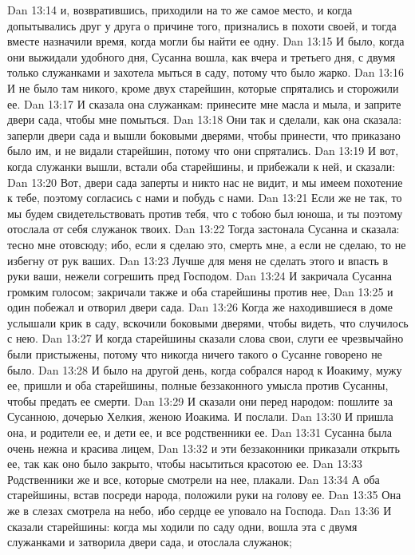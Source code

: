 \vs Dan 13:14 и, возвратившись, приходили на то же самое место, и когда допытывались друг у друга о причине того, признались в похоти своей, и тогда вместе назначили время, когда могли бы найти ее одну.
\vs Dan 13:15 И было, когда они выжидали удобного дня, Сусанна вошла, как вчера и третьего дня, с двумя только служанками и захотела мыться в саду, потому что было жарко.
\vs Dan 13:16 И не было там никого, кроме двух старейшин, которые спрятались и сторожили ее.
\vs Dan 13:17 И сказала она служанкам: принесите мне масла и мыла, и заприте двери сада, чтобы мне помыться.
\vs Dan 13:18 Они так и сделали, как она сказала: заперли двери сада и вышли боковыми дверями, чтобы принести, что приказано было им, и не видали старейшин, потому что они спрятались.
\vs Dan 13:19 И вот, когда служанки вышли, встали оба старейшины, и прибежали к ней, и сказали:
\vs Dan 13:20 Вот, двери сада заперты и никто нас не видит, и мы имеем похотение к тебе, поэтому согласись с нами и побудь с нами.
\vs Dan 13:21 Если же не так, то мы будем свидетельствовать против тебя, что с тобою был юноша, и ты поэтому отослала от себя служанок твоих.
\vs Dan 13:22 Тогда застонала Сусанна и сказала: тесно мне отовсюду; ибо, если я сделаю это, смерть мне, а если не сделаю, то не избегну от рук ваших.
\vs Dan 13:23 Лучше для меня не сделать этого и впасть в руки ваши, нежели согрешить пред Господом.
\vs Dan 13:24 И закричала Сусанна громким голосом; закричали также и оба старейшины против нее,
\vs Dan 13:25 и один побежал и отворил двери сада.
\vs Dan 13:26 Когда же находившиеся в доме услышали крик в саду, вскочили боковыми дверями, чтобы видеть, что случилось с нею.
\vs Dan 13:27 И когда старейшины сказали слова свои, слуги ее чрезвычайно были пристыжены, потому что никогда ничего такого о Сусанне говорено не было.
\vs Dan 13:28 И было на другой день, когда собрался народ к Иоакиму, мужу ее, пришли и оба старейшины, полные беззаконного умысла против Сусанны, чтобы предать ее смерти.
\vs Dan 13:29 И сказали они перед народом: пошлите за Сусанною, дочерью Хелкия, женою Иоакима. И послали.
\vs Dan 13:30 И пришла она, и родители ее, и дети ее, и все родственники ее.
\vs Dan 13:31 Сусанна была очень нежна и красива лицем,
\vs Dan 13:32 и эти беззаконники приказали открыть  ее, так как оно было закрыто, чтобы насытиться красотою ее.
\vs Dan 13:33 Родственники же и все, которые смотрели на нее, плакали.
\vs Dan 13:34 А оба старейшины, встав посреди народа, положили руки на голову ее.
\vs Dan 13:35 Она же в слезах смотрела на небо, ибо сердце ее уповало на Господа.
\vs Dan 13:36 И сказали старейшины: когда мы ходили по саду одни, вошла эта с двумя служанками и затворила двери сада, и отослала служанок;

